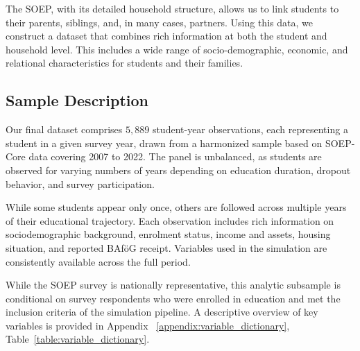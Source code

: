 The SOEP, with its detailed household structure, allows us to link students to their parents, siblings, and, in many cases, partners. 
Using this data, we construct a dataset that combines rich information at both the student and household level. 
This includes a wide range of socio-demographic, economic, and relational characteristics for students and their families.

\subsection{Sample Description}
Our final dataset comprises \(5{,}889\) student-year observations, each representing a student in a given survey year, drawn from a harmonized sample based on SOEP-Core data covering 2007 to 2022. 
The panel is unbalanced, as students are observed for varying numbers of years depending on education duration, dropout behavior, and survey participation.

While some students appear only once, others are followed across multiple years of their educational trajectory. 
Each observation includes rich information on sociodemographic background, enrolment status, income and assets, housing situation, and reported BAföG receipt. 
Variables used in the simulation are consistently available across the full period.


While the SOEP survey is nationally representative, this analytic subsample is conditional on survey respondents who were enrolled in education and met the inclusion criteria of the simulation pipeline. 
A descriptive overview of key variables is provided in Appendix ~\ref{appendix:variable_dictionary}, Table~\ref{table:variable_dictionary}.




